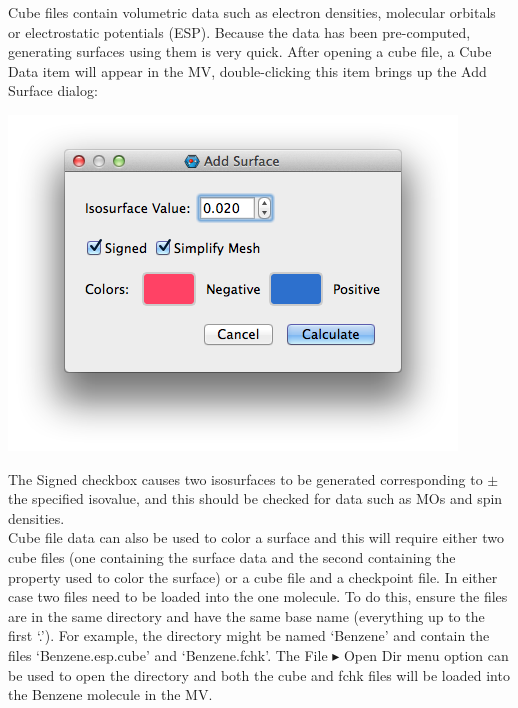 \documentclass[a4paper,12pt]{article}
\begin{document}
Cube files contain volumetric data such as electron densities, molecular
orbitals or electrostatic potentials (ESP).  Because the data has been
pre-computed, generating surfaces using them is very quick.  After opening a
cube file, a Cube Data item will appear in the MV, double-clicking this item
brings up the Add Surface dialog:  
\begin{center}
\includegraphics[scale=0.5]{figures/AddSurface.png} \\
\end{center}
The Signed checkbox causes two isosurfaces to be generated corresponding to
$\pm$ the specified isovalue, and this should be checked for data such as MOs
and spin densities.\\

Cube file data can also be used to color a surface and this will require either
two cube files (one containing the surface data and the second containing the
property used to color the surface) or a cube file and a checkpoint file.  In
either case two files need to be loaded into the one molecule.  To do this,
ensure the files are in the same directory and have the same base name
(everything up to the first `.').  For example, the directory might be named
`Benzene' and contain the files `Benzene.esp.cube' and `Benzene.fchk'.  The
File $\blacktriangleright$ Open Dir menu option can be used to open the
directory and both the cube and fchk files will be loaded into the Benzene
molecule in the MV.  \\
\end{document}
